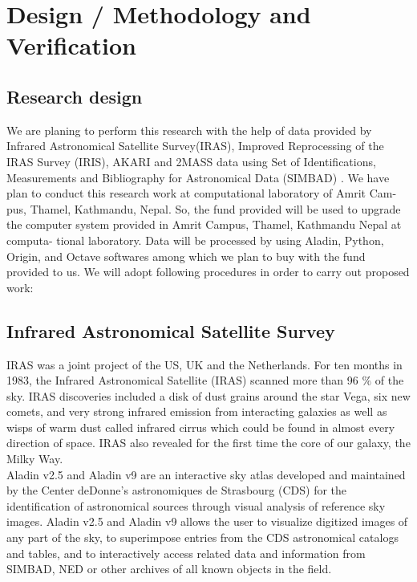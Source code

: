 \documentclass[fleqn,a4paper,12pt,oneside]{article}
\begin{document}
\section{Design / Methodology and Verification }
\subsection{Research design}
We are planing to perform this research  with the help of data provided by Infrared Astronomical Satellite Survey(IRAS), Improved Reprocessing of the IRAS Survey (IRIS), AKARI and 2MASS data using Set of Identifications, Measurements and Bibliography for Astronomical Data (SIMBAD) \cite{34,35}. We have plan to conduct this research work at computational laboratory of Amrit Cam-
pus, Thamel, Kathmandu, Nepal. So, the fund provided will be used to upgrade the
computer system provided in Amrit Campus, Thamel, Kathmandu Nepal at computa-
tional laboratory. Data will be processed by using Aladin, Python, Origin, and Octave
softwares among which we plan to buy with the fund provided to us. We will adopt
following procedures in order to carry out proposed work:
\subsection{Infrared Astronomical Satellite Survey}
IRAS was a joint project of the US, UK and the Netherlands.  For ten months in 1983, the Infrared Astronomical
Satellite (IRAS) scanned more than 96 $\%$ of the sky.
 IRAS discoveries included a disk of dust grains around the star
Vega, six new comets, and very strong infrared emission from
interacting galaxies as well as wisps of warm dust called infrared
cirrus which could be found in almost every direction of space.
IRAS also revealed for the first time the core of our galaxy, the
Milky Way. 
\\
Aladin v2.5 and Aladin v9 are an interactive sky atlas developed and maintained by the Center deDonne's astronomiques de Strasbourg (CDS) for the identification
of astronomical sources through visual analysis of reference sky
images. Aladin v2.5 and Aladin v9 allows the user to visualize digitized images
of any part of the sky, to superimpose entries from the CDS
astronomical catalogs and tables, and to interactively access
related data and information from SIMBAD, NED or other archives of
all known objects in the field.
\end{document}
